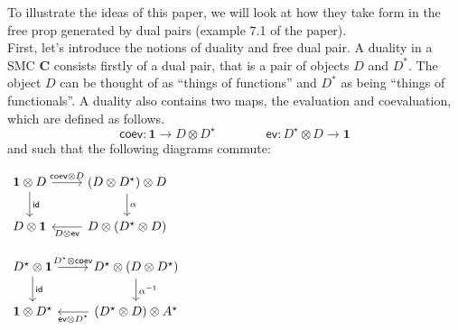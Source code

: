 \documentclass[pra,floatfix,
amsmath,superscriptaddress, 12pt]{article}
\theoremstyle{definition}
\newcommand{\cC}{\mathbf{C}}
\begin{document}
To illustrate the ideas of this paper, we will look at how they take form in the free prop generated by dual pairs (example 7.1 of the paper). \\

First, let's introduce the notions of duality and free dual pair. A duality in a SMC $\cC$ consists firstly of a dual pair, that is a pair of objects $D$ and $D^*$. The object $D$ can be thought of as ``things of functions'' and $D^*$ as being ``things of functionals''. A duality also contains two maps, the evaluation and coevaluation, which are defined as follows.
					$$\textsf{coev}: \mathbf{1} \longrightarrow D \otimes D^\star \qquad \qquad
					\textsf{ev}: D^\star \otimes D \longrightarrow \mathbf{1}$$
and such that the following diagrams commute:\\

\begin{minipage}{0.5\textwidth}
\begin{center}
						\begin{math}
							\begin{tikzcd}[ampersand replacement=\&]
								\mathbf{1} \otimes D
								\arrow[r,"\mathsf{coev}\otimes D"]
								\arrow[d,"\mathsf{id}"]
									\& \left( D \otimes D^{\star} \right) \otimes D \arrow[d,"\alpha"] \\
								D \otimes \mathbf{1}
									\& D \otimes \left( D^{\star} \otimes D \right)
									\arrow[l, "D \otimes \mathsf{ev}"]
							\end{tikzcd}
						\end{math}
						\end{center}
\end{minipage}
				\begin{minipage}{0.5\textwidth}
\begin{center}
\begin{math}
							\begin{tikzcd}[ampersand replacement=\&]
								D^{\star} \otimes \mathbf{1}
								\arrow[r, "D^{\star} \otimes \mathsf{coev}"]
								\arrow[d, "\mathsf{id}"]
									\& D^{\star} \otimes \left( D \otimes D^{\star} \right)
									\arrow[d, "\alpha^{-1}"] \\
								\mathbf{1} \otimes D^{\star}
									\& \left( D^{\star} \otimes D \right) \otimes A^{\star} 
									\arrow[l, "\mathsf{ev} \otimes D^{\star}"]
							\end{tikzcd}
						\end{math}
						\end{center}
\end{minipage}
\smallskip
\end{document}
